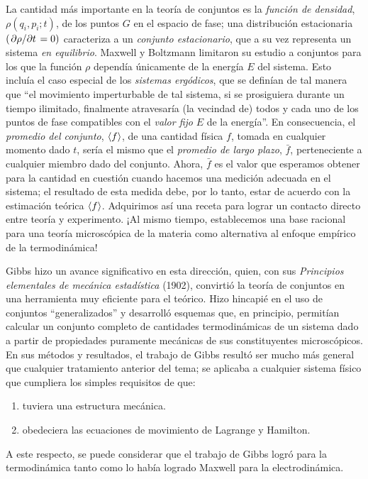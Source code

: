 La cantidad más importante en la teoría de conjuntos es la \emph{función de densidad}, $\rho (q_{i}, p_{i} ; t)$, de los puntos $G$ en el espacio de fase; una distribución estacionaria $(\pdv*{\rho}{t} = 0)$ caracteriza a un \emph{conjunto estacionario}, que a su vez representa un sistema \emph{en equilibrio}. Maxwell y Boltzmann limitaron su estudio a conjuntos para los que la función $\rho$ dependía únicamente de la energía $E$ del sistema. Esto incluía el caso especial de los \emph{sistemas ergódicos}, que se definían de tal manera que \enquote{el movimiento imperturbable de tal sistema, si se prosiguiera durante un tiempo ilimitado, finalmente atravesaría (la vecindad de) todos y cada uno de los puntos de fase compatibles con el \emph{valor fijo} $E$ de la energía}. En consecuencia, el \emph{promedio del conjunto}, $\expval{f}$, de una cantidad física $f$, tomada en cualquier momento dado $t$, sería el mismo que el \emph{promedio de largo plazo}, $\bar{f}$, perteneciente a cualquier miembro dado del conjunto. Ahora, $\bar{f}$ es el valor que esperamos obtener para la cantidad en cuestión cuando hacemos una medición adecuada en el sistema; el resultado de esta medida debe, por lo tanto, estar de acuerdo con la estimación teórica $\expval{f}$. Adquirimos así una receta para lograr un contacto directo entre teoría y experimento. ¡Al mismo tiempo, establecemos una base racional para una teoría microscópica de la materia como alternativa al enfoque empírico de la termodinámica!
\par
Gibbs hizo un avance significativo en esta dirección, quien, con sus \emph{Principios elementales de mecánica estadística} (1902), convirtió la teoría de conjuntos en una herramienta muy eficiente para el teórico. Hizo hincapié en el uso de conjuntos \enquote{generalizados} y desarrolló esquemas que, en principio, permitían calcular un conjunto completo de cantidades termodinámicas de un sistema dado a partir de propiedades puramente mecánicas de sus constituyentes microscópicos. En sus métodos y resultados, el trabajo de Gibbs resultó ser mucho más general que cualquier tratamiento anterior del tema; se aplicaba a cualquier sistema físico que cumpliera los simples requisitos de que:
\begin{enumerate}[label=\roman*)]
\item tuviera una estructura mecánica.
\item obedeciera las ecuaciones de movimiento de Lagrange y Hamilton.
\end{enumerate}
A este respecto, se puede considerar que el trabajo de Gibbs logró para la termodinámica tanto como lo había logrado Maxwell para la electrodinámica.

